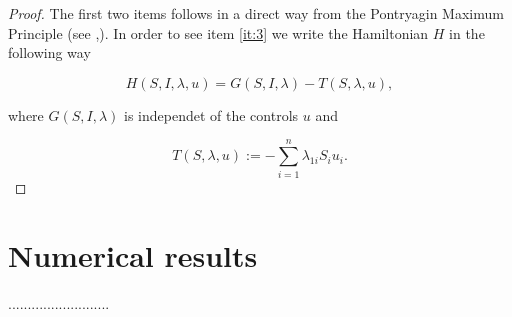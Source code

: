 \documentclass[a4paper,10pt]{article}
\theoremstyle{remark}
\begin{document}
\begin{proof}  The first two items follows in a direct way from the Pontryagin Maximum Principle (see \cite[Th. 4.3]{LawrenceEvans500},\cite{Chen-2014}). In order to see item \ref{it:3} we write the Hamiltonian $H$ in the following way
 
 $$ H(S,I,\lambda, u)=G(S,I,\lambda)-T(S,\lambda, u),$$
 
where $G(S,I,\lambda)$ is independet of the controls $ u$ and
 
$$T(S,\lambda, u):= -\sum_{i=1}^n\lambda_{1i}S_i u_i.$$


 
\end{proof}






\section{Numerical results}  

..........................



  
  
\end{document}
